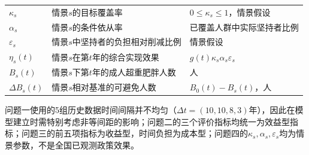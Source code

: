 \begin{longtable}{p{1.6cm}p{4.0cm}p{6.5cm}}
$\kappa_s$ & 情景$s$的目标覆盖率 & $0\leq\kappa_s\leq1$，情景假设 \\
$\alpha_s$ & 情景$s$的条件依从率 & 已覆盖人群中实际坚持者比例 \\
$\varepsilon_s$ & 情景$s$中坚持者的负担相对削减比例 & 情景假设 \\
$\eta_s(t)$ & 情景$s$在第$t$年的综合实现效果 & $g(t)\kappa_s\alpha_s\varepsilon_s$ \\
$B_s(t)$ & 情景$s$下第$t$年的成人超重肥胖人数 & 人 \\
$\Delta B_s(t)$ & 情景$s$相对基准的可避免人数 & $B_0(t)-B_s(t)$，人 \\
\bottomrule
\end{longtable}
\endgroup

问题一使用的5组历史数据时间间隔并不均匀（$\Delta t = (10, 10, 8, 3)$年），因此在模型建立时需特别考虑非等间距的影响；问题二的三个评价指标均统一为效益型指标；问题三的前五项指标为收益型，时间负担为成本型；问题四的$\kappa_s,\alpha_s,\varepsilon_s$均为情景参数，不是全国已观测政策效果。

